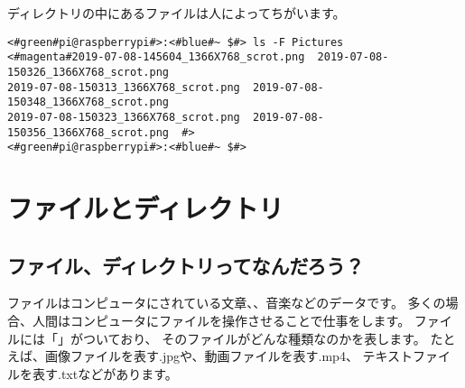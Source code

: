 ディレクトリの中にあるファイルは人によってちがいます。
\begin{lstlisting}[caption=ls -F Pictures/コマンドの例,label=lsFPicttest]
<#green#pi@raspberrypi#>:<#blue#~ $#> ls -F Pictures
<#magenta#2019-07-08-145604_1366X768_scrot.png  2019-07-08-150326_1366X768_scrot.png  
2019-07-08-150313_1366X768_scrot.png  2019-07-08-150348_1366X768_scrot.png  
2019-07-08-150323_1366X768_scrot.png  2019-07-08-150356_1366X768_scrot.png  #>
<#green#pi@raspberrypi#>:<#blue#~ $#> 
\end{lstlisting}

\begin{tcolorbox}[title=\useOmetoi]
\begin{enumerate}
\end{enumerate}
\end{tcolorbox}

\section{ファイルとディレクトリ}
\subsection{ファイル、ディレクトリってなんだろう？}
ファイルはコンピュータにされている文章、、音楽などのデータです。
多くの場合、人間はコンピュータにファイルを操作させることで仕事をします。
ファイルには「」がついており、
そのファイルがどんな種類なのかを表します。
たとえば、画像ファイルを表す.jpgや、動画ファイルを表す.mp4、
テキストファイルを表す.txtなどがあります。

